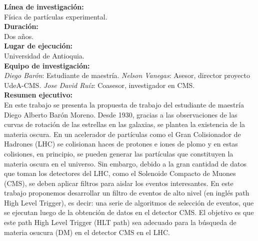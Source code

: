 \textbf{Línea de investigación:}\\
Física de partículas experimental.
\\

\textbf{Duración:}\\
Dos años.
\\

\textbf{Lugar de ejecución:}\\
Universidad de Antioquia.
\\

\textbf{Equipo de investigación:}\\
\emph{Diego Barón}: Estudiante de maestría.
\emph{Nelson Vanegas}: Asesor, director proyecto UdeA-CMS.
\emph{Jose David Ruíz}: Coasesor, investigador en CMS.
\\

\textbf{Resumen ejecutivo:}\\
En este trabajo se presenta la propuesta de trabajo del estudiante de maestría Diego Alberto Barón Moreno. Desde 1930, gracias a las observaciones de las curvas de rotación de las estrellas en las galaxias, se plantea la existencia de la materia oscura. En un acelerador de partículas como el Gran Colisionador de Hadrones (LHC) se colisionan haces de protones e iones de plomo y en estas colisiones, en principio, se pueden generar las partículas que constituyen la materia oscura en el universo. Sin embargo, debido a la gran cantidad de datos que toman los detectores del LHC, como el Solenoide Compacto de Muones (CMS)\cite{Bayatian:2006nff}, se deben aplicar filtros para aislar los eventos interesantes. En este trabajo proponemos desarrollar un filtro de eventos de alto nivel (en inglés path High Level Trigger), es decir: una serie de algoritmos de selección de eventos, que se ejecutan luego de la obtención de datos en el detector CMS. El objetivo es que este path High Level Trigger (HLT path) sea adecuado para la búsqueda de materia osucura (DM) en el detector CMS en el LHC.


\newpage























